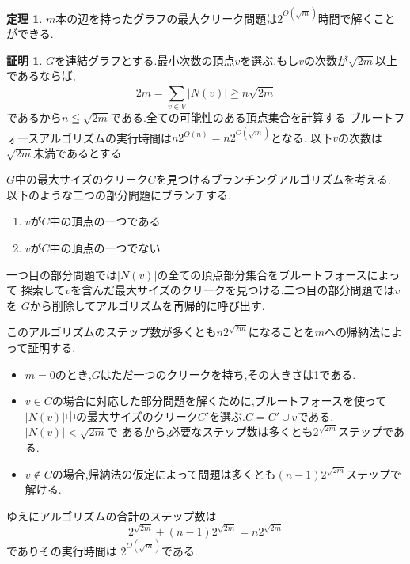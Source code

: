 \documentclass{thesis}
\theoremstyle{definition}
\newtheorem{theorem}{定理}[chapter]
\newtheorem*{prf*}{証明}
\begin{document}
\begin{theorem} \label{theorem:1}
$m$本の辺を持ったグラフの最大クリーク問題は$2^{O(\sqrt{m})}$時間で解くことができる.
\begin{prf*}
$G$を連結グラフとする.最小次数の頂点$v$を選ぶ.もし$v$の次数が$\sqrt{2m}$以上であるならば,
\[ 2m = \sum_{v \in V}^{} |N(v)| \geqq n\sqrt{2m} \]
であるから$n \leqq \sqrt{2m}$である.全ての可能性のある頂点集合を計算する
ブルートフォースアルゴリズムの実行時間は$n2^{O(n)} = n2^{O(\sqrt{m})}$となる.
以下$v$の次数は$\sqrt{2m}$未満であるとする.

$G$中の最大サイズのクリーク$C$を見つけるブランチングアルゴリズムを考える.
以下のような二つの部分問題にブランチする.
\begin{enumerate}
 \item $v$が$C$中の頂点の一つである
 \item $v$が$C$中の頂点の一つでない
\end{enumerate}
一つ目の部分問題では$|N(v)|$の全ての頂点部分集合をブルートフォースによって
探索して$v$を含んだ最大サイズのクリークを見つける.二つ目の部分問題では$v$を
$G$から削除してアルゴリズムを再帰的に呼び出す.

このアルゴリズムのステップ数が多くとも$n2^{\sqrt{2m}}$になることを$m$への帰納法によって証明する.
\begin{itemize}
 \item $m = 0$のとき,$G$はただ一つのクリークを持ち,その大きさは1である.	
 \item $v \in C$の場合に対応した部分問題を解くために,ブルートフォースを使って
$|N(v)|$中の最大サイズのクリーク$C'$を選ぶ.$C = C'  \cup  v$である.$|N(v)| < \sqrt{2m}$で
あるから,必要なステップ数は多くとも$2^{\sqrt{2m}}$ステップである.
 \item $v \notin C$の場合,帰納法の仮定によって問題は多くとも$(n - 1)2^{\sqrt{2m}}$ステップで解ける.
\end{itemize}
ゆえにアルゴリズムの合計のステップ数は
\[  2^{\sqrt{2m}} +  (n - 1)2^{\sqrt{2m}} = n2^{\sqrt{2m}} \]
でありその実行時間は $2^{O(\sqrt{m})}$である.
\end{prf*}
\end{theorem}
\end{document}
